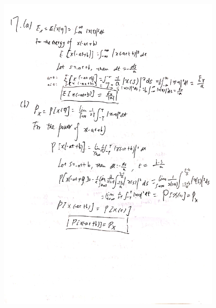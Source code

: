 \documentclass[a4paper]{article}
\begin{document}
\begin{figure}[H]
  \begin{center}
    \includegraphics[width=1\textwidth]{17.jpg}
  \end{center}
\end{figure}
\end{document}
